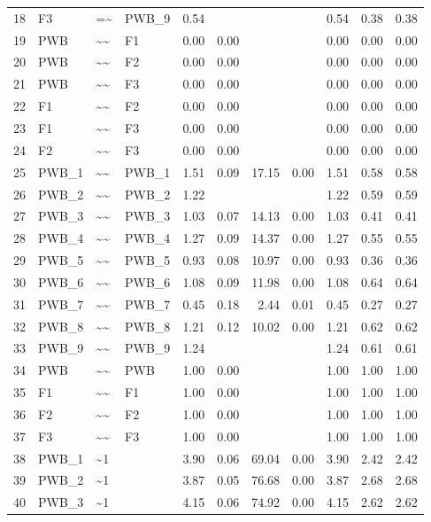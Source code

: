 \documentclass{article}
\begin{document}
\begin{table}[ht]
\begin{tabular}{rlllrrrrrrr}
  18 & F3 & =\~{} & PWB\_9 & 0.54 &  &  &  & 0.54 & 0.38 & 0.38 \\ 
  19 & PWB & \~{}\~{} & F1 & 0.00 & 0.00 &  &  & 0.00 & 0.00 & 0.00 \\ 
  20 & PWB & \~{}\~{} & F2 & 0.00 & 0.00 &  &  & 0.00 & 0.00 & 0.00 \\ 
  21 & PWB & \~{}\~{} & F3 & 0.00 & 0.00 &  &  & 0.00 & 0.00 & 0.00 \\ 
  22 & F1 & \~{}\~{} & F2 & 0.00 & 0.00 &  &  & 0.00 & 0.00 & 0.00 \\ 
  23 & F1 & \~{}\~{} & F3 & 0.00 & 0.00 &  &  & 0.00 & 0.00 & 0.00 \\ 
  24 & F2 & \~{}\~{} & F3 & 0.00 & 0.00 &  &  & 0.00 & 0.00 & 0.00 \\ 
  25 & PWB\_1 & \~{}\~{} & PWB\_1 & 1.51 & 0.09 & 17.15 & 0.00 & 1.51 & 0.58 & 0.58 \\ 
  26 & PWB\_2 & \~{}\~{} & PWB\_2 & 1.22 &  &  &  & 1.22 & 0.59 & 0.59 \\ 
  27 & PWB\_3 & \~{}\~{} & PWB\_3 & 1.03 & 0.07 & 14.13 & 0.00 & 1.03 & 0.41 & 0.41 \\ 
  28 & PWB\_4 & \~{}\~{} & PWB\_4 & 1.27 & 0.09 & 14.37 & 0.00 & 1.27 & 0.55 & 0.55 \\ 
  29 & PWB\_5 & \~{}\~{} & PWB\_5 & 0.93 & 0.08 & 10.97 & 0.00 & 0.93 & 0.36 & 0.36 \\ 
  30 & PWB\_6 & \~{}\~{} & PWB\_6 & 1.08 & 0.09 & 11.98 & 0.00 & 1.08 & 0.64 & 0.64 \\ 
  31 & PWB\_7 & \~{}\~{} & PWB\_7 & 0.45 & 0.18 & 2.44 & 0.01 & 0.45 & 0.27 & 0.27 \\ 
  32 & PWB\_8 & \~{}\~{} & PWB\_8 & 1.21 & 0.12 & 10.02 & 0.00 & 1.21 & 0.62 & 0.62 \\ 
  33 & PWB\_9 & \~{}\~{} & PWB\_9 & 1.24 &  &  &  & 1.24 & 0.61 & 0.61 \\ 
  34 & PWB & \~{}\~{} & PWB & 1.00 & 0.00 &  &  & 1.00 & 1.00 & 1.00 \\ 
  35 & F1 & \~{}\~{} & F1 & 1.00 & 0.00 &  &  & 1.00 & 1.00 & 1.00 \\ 
  36 & F2 & \~{}\~{} & F2 & 1.00 & 0.00 &  &  & 1.00 & 1.00 & 1.00 \\ 
  37 & F3 & \~{}\~{} & F3 & 1.00 & 0.00 &  &  & 1.00 & 1.00 & 1.00 \\ 
  38 & PWB\_1 & \~{}1 &  & 3.90 & 0.06 & 69.04 & 0.00 & 3.90 & 2.42 & 2.42 \\ 
  39 & PWB\_2 & \~{}1 &  & 3.87 & 0.05 & 76.68 & 0.00 & 3.87 & 2.68 & 2.68 \\ 
  40 & PWB\_3 & \~{}1 &  & 4.15 & 0.06 & 74.92 & 0.00 & 4.15 & 2.62 & 2.62 \\ 

\end{tabular}
\end{table}
\end{document}
